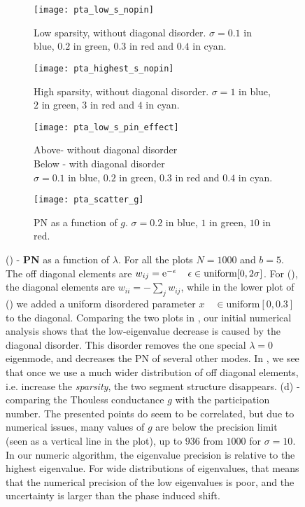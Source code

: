\begin{figure}[H]

  \begin{subfigure}{.45\linewidth}\centering
    \texttt{[image: pta\_low\_s\_nopin]}
    \caption{Low sparsity, without diagonal disorder. $\sigma=0.1$ in blue, $0.2$ in green, $0.3$ in red
    and $0.4$ in cyan.}\label{fig:PN_kottos_nopin}
  \end{subfigure}
  \begin{subfigure}{.45\linewidth}\centering
     \texttt{[image: pta\_highest\_s\_nopin]}
  \caption{High sparsity, without diagonal disorder. $\sigma=1$ in blue, $2$ in green, $3$ in red
    and $4$ in cyan.}\label{fig:PN_kottos_sparse}
  \end{subfigure}
    \begin{subfigure}{.45\linewidth}
    \texttt{[image: pta\_low\_s\_pin\_effect]}
    \caption{Above- without diagonal disorder\\ Below - with diagonal disorder\\$\sigma=0.1$ in blue, $0.2$ in green, $0.3$ in red
    and $0.4$ in cyan.}\label{fig:PN_kottos_pinning}
  \end{subfigure}     
  \begin{subfigure}{.45\linewidth}
     \texttt{[image: pta\_scatter\_g]}
  \caption{PN as a function of $g$. 
   $\sigma=0.2$ in blue, $1$ in green, $10$ in red.}\label{fig:PN_g_scatter}
  \end{subfigure}
  \caption{() - {\bf PN} as a function of $\lambda$.
  For all the plots $N=1000$ and $b=5$. 
  The off diagonal elements are 
  $w_{ij} = \mbox{e}^{-\epsilon} \quad \, \epsilon \in \textrm{uniform} [0,2\sigma]$.
  For (), the diagonal elements are $w_{ii} = -\sum_j w_{ij}$, while in 
  the lower plot of () we added a uniform 
  disordered parameter $x \quad \in \textrm{uniform} [0,0.3]$ to the diagonal.
  Comparing the two plots in , our initial numerical analysis 
  shows that the low-eigenvalue decrease
  is caused by the diagonal disorder. This disorder removes the one special 
  $\lambda=0$ eigenmode, and decreases the PN of several other modes.
  In , we see that once we use a much wider
distribution of off diagonal elements, i.e. increase the \emph{sparsity}, 
the two segment structure disappears.
  (d) - comparing the Thouless conductance $g$ with the participation number. 
  The presented points do seem to be correlated, but due to numerical issues,
  many values of $g$ are below the precision limit (seen as a vertical line in the plot), up to $936$ from $1000$ for $\sigma=10$. In our numeric 
  algorithm, the eigenvalue precision is relative to the highest eigenvalue. For wide distributions
  of eigenvalues, that means that the numerical precision of the low eigenvalues is poor,
  and the uncertainty is larger than the phase induced shift.
  }
\end{figure}
